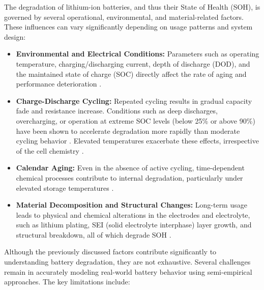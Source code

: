 The degradation of lithium-ion batteries, and thus their State of Health (SOH), is governed by several operational, environmental, and material-related factors. These influences can vary significantly depending on usage patterns and system design:

\begin{itemize}
    \item \textbf{Environmental and Electrical Conditions:} Parameters such as operating temperature, charging/discharging current, depth of discharge (DOD), and the maintained state of charge (SOC) directly affect the rate of aging and performance deterioration \cite{energies-18-00342-v2}.
    
    \item \textbf{Charge-Discharge Cycling:} Repeated cycling results in gradual capacity fade and resistance increase. Conditions such as deep discharges, overcharging, or operation at extreme SOC levels (below 25\% or above 90\%) have been shown to accelerate degradation more rapidly than moderate cycling behavior \cite{electronics-13-01675,batteries-10-00181-v2,energies-18-00342-v2}. Elevated temperatures exacerbate these effects, irrespective of the cell chemistry \cite{energies-18-00342-v2}.
    
    \item \textbf{Calendar Aging:} Even in the absence of active cycling, time-dependent chemical processes contribute to internal degradation, particularly under elevated storage temperatures \cite{energies-18-00342-v2}.
    
    \item \textbf{Material Decomposition and Structural Changes:} Long-term usage leads to physical and chemical alterations in the electrodes and electrolyte, such as lithium plating, SEI (solid electrolyte interphase) layer growth, and structural breakdown, all of which degrade SOH \cite{energies-18-00342-v2}.
\end{itemize}


Although the previously discussed factors contribute significantly to understanding battery degradation, they are not exhaustive. Several challenges remain in accurately modeling real-world battery behavior using semi-empirical approaches. The key limitations include:

